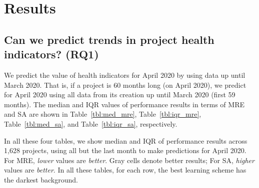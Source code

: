 \documentclass[sigconf,anonymous,review]{acmart}
\newcommand{\bi}{\begin{itemize}}
\newcommand{\ei}{\end{itemize}}
\begin{document}
\section{Results}
\label{sect:resul} 
\subsection{Can we predict trends in project health indicators? (RQ1)}






We predict the value of health indicators for April 2020 by using data up until March 2020. That is, if a project is 60 months long (on April 2020), we predict for April 2020 using all data from its creation up until March 2020 (first 59 months). The median and IQR values of performance results in terms of MRE and SA are shown in Table~\ref{tbl:med_mre}, Table~\ref{tbl:iqr_mre},  Table~\ref{tbl:med_sa}, and Table~\ref{tbl:iqr_sa}, respectively.

In all these four tables, we show median  and IQR of performance results across 1,628 projects,  using all but the last month to make predictions for  April 2020. For MRE, {\em lower} values are {\em better}. Gray cells denote better results; For SA, {\em higher} values are {\em better}. In all these tables, for each row, the best learning scheme has the darkest background.
\end{document}
